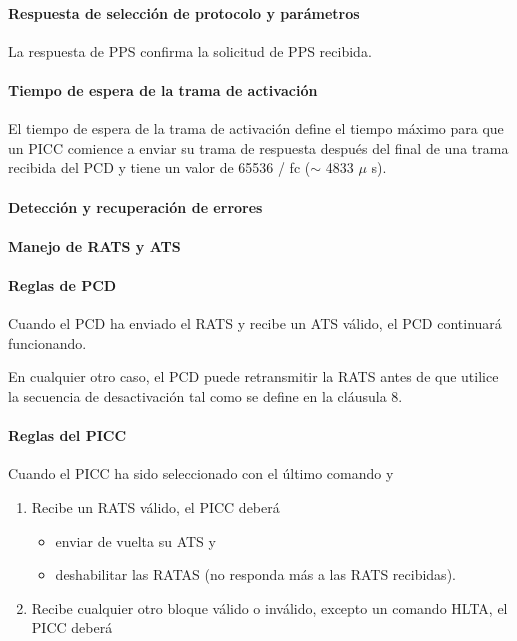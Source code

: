 \paragraph{Respuesta de selección de protocolo y parámetros}
La respuesta de PPS confirma la solicitud de PPS recibida.\par

\paragraph{Tiempo de espera de la trama de activación}
El tiempo de espera de la trama de activación define el tiempo máximo para que un PICC comience a enviar su trama de respuesta después del final de una trama recibida del PCD y tiene un valor de 65536 / fc ($ \sim $  4833 $ \mu $ s).\par

\paragraph{Detección y recuperación de errores}
\paragraph{Manejo de RATS y ATS}
\paragraph{Reglas de PCD}
Cuando el PCD ha enviado el RATS y recibe un ATS válido, el PCD continuará funcionando.\par

En cualquier otro caso, el PCD puede retransmitir la RATS antes de que utilice la secuencia de desactivación tal como se define en la cláusula 8.\par

\paragraph{Reglas del PICC}
Cuando el PICC ha sido seleccionado con el último comando y\par

\begin{enumerate}
	\item Recibe un RATS válido, el PICC deberá\par

\begin{itemize}
	\item enviar de vuelta su ATS y\par

	\item deshabilitar las RATAS (no responda más a las RATS recibidas).
\end{itemize}\par

	\item Recibe cualquier otro bloque válido o inválido, excepto un comando HLTA, el PICC deberá
\end{enumerate}\par

